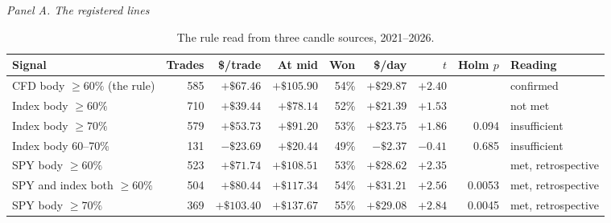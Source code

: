 \documentclass[12pt,letterpaper]{article}
\newcommand{\tabfont}{\footnotesize}
\newcommand{\dollar}{\$}
\begin{document}
\begin{table}[htbp]
\centering
\small
\renewcommand{\tabfont}{\fontsize{9}{11}\selectfont}
\caption{The rule read from three candle sources, 2021--2026.}
\label{tab:source}
\begin{minipage}{\linewidth}\centering
\textit{Panel A. The registered lines}\par\smallskip
\setlength{\tabcolsep}{4pt}
\begin{tabular}{@{}lrrrrrrrl@{}}
\toprule
Signal & Trades & \$/trade & At mid & Won & \$/day & $t$ & Holm $p$ & Reading \\
\midrule
CFD body $\ge 60\%$ (the rule) & 585 & $+\dollar67.46$ & $+\dollar105.90$ & 54\% & $+\dollar29.87$ & $+2.40$ &  & confirmed \\
\addlinespace
Index body $\ge 60\%$ & 710 & $+\dollar39.44$ & $+\dollar78.14$ & 52\% & $+\dollar21.39$ & $+1.53$ &  & not met \\
Index body $\ge 70\%$ & 579 & $+\dollar53.73$ & $+\dollar91.20$ & 53\% & $+\dollar23.75$ & $+1.86$ & 0.094 & insufficient \\
Index body 60--70\% & 131 & $-\dollar23.69$ & $+\dollar20.44$ & 49\% & $-\dollar2.37$ & $-0.41$ & 0.685 & insufficient \\
\addlinespace
SPY body $\ge 60\%$ & 523 & $+\dollar71.74$ & $+\dollar108.51$ & 53\% & $+\dollar28.62$ & $+2.35$ &  & met, retrospective \\
SPY and index both $\ge 60\%$ & 504 & $+\dollar80.44$ & $+\dollar117.34$ & 54\% & $+\dollar31.21$ & $+2.56$ & 0.0053 & met, retrospective \\
SPY body $\ge 70\%$ & 369 & $+\dollar103.40$ & $+\dollar137.67$ & 55\% & $+\dollar29.08$ & $+2.84$ & 0.0045 & met, retrospective \\
\bottomrule
\end{tabular}
\end{minipage}


\end{table}
\end{document}
